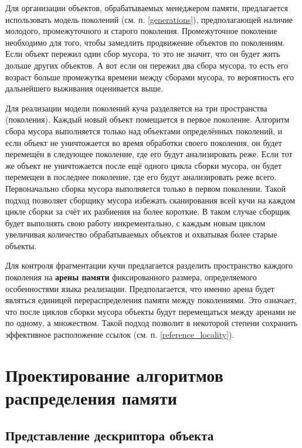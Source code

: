 Для организации объектов, обрабатываемых менеджером памяти, предлагается использовать модель поколений (см. п. \ref{generations}), предполагающей наличие молодого, промежуточного и старого поколения. Промежуточное поколение необходимо для того, чтобы замедлить продвижение объектов по поколениям. Если объект пережил один сбор мусора, то это не значит, что он будет жить дольше других объектов. А вот если он пережил два сбора мусора, то есть его возраст больше промежутка времени между сборами мусора, то вероятность его дальнейшего выживания оценивается выше.

Для реализации модели поколений куча разделяется на три пространства (поколения). Каждый новый объект помещается в первое поколение. Алгоритм сбора мусора выполняется только над объектами определённых поколений, и если объект не уничтожается во время обработки своего поколения, он будет перемещён в следующее поколение, где его будут анализировать реже. Если тот же объект не уничтожается после ещё одного цикла сборки мусора, он будет перемещен в последнее поколение, где его будут анализировать реже всего. Первоначально сборка мусора выполняется только в первом поколении. Такой подход позволяет сборщику мусора избежать сканирования всей кучи на каждом цикле сборки за счёт их разбиения на более короткие. В таком случае сборщик будет выполнять свою работу инкрементально, с каждым новым циклом увеличивая количество обрабатываемых объектов и охватывая более старые объекты.

Для контроля фрагментации кучи предлагается разделить пространство каждого поколения на \textbf{арены памяти} фиксированного размера, определяемого особенностями языка реализации. Предполагается, что именно арена будет являться единицей перераспределения памяти между поколениями. Это означает, что после циклов сборки мусора объекты будут перемещаться между аренами не по одному, а множеством. Такой подход позволит в некоторой степени сохранить эффективное расположение ссылок (см. п. \ref{reference_locality}).



\section{Проектирование алгоритмов распределения памяти}

\subsection{Представление дескриптора объекта}

